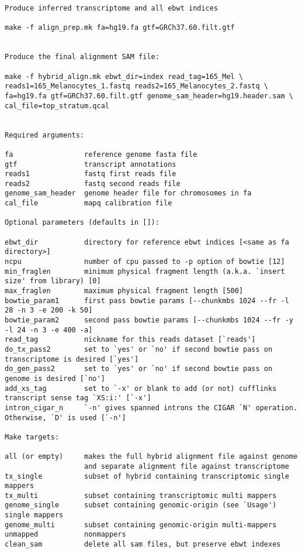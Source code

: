 \documentclass[10pt]{article}
\begin{document}
{\small
\begin{verbatim}
Produce inferred transcriptome and all ebwt indices

make -f align_prep.mk fa=hg19.fa gtf=GRCh37.60.filt.gtf


Produce the final alignment SAM file:

make -f hybrid_align.mk ebwt_dir=index read_tag=165_Mel \
reads1=165_Melanocytes_1.fastq reads2=165_Melanocytes_2.fastq \
fa=hg19.fa gtf=GRCh37.60.filt.gtf genome_sam_header=hg19.header.sam \
cal_file=top_stratum.qcal


Required arguments:

fa                 reference genome fasta file
gtf                transcript annotations
reads1             fastq first reads file
reads2             fastq second reads file
genome_sam_header  genome header file for chromosomes in fa
cal_file           mapq calibration file

Optional parameters (defaults in []):

ebwt_dir           directory for reference ebwt indices [<same as fa directory>]
ncpu               number of cpu passed to -p option of bowtie [12]
min_fraglen        minimum physical fragment length (a.k.a. `insert size' from library) [0]
max_fraglen        maximum physical fragment length [500]
bowtie_param1      first pass bowtie params [--chunkmbs 1024 --fr -l 28 -n 3 -e 200 -k 50]
bowtie_param2      second pass bowtie params [--chunkmbs 1024 --fr -y -l 24 -n 3 -e 400 -a]
read_tag           nickname for this reads dataset [`reads']
do_tx_pass2        set to `yes' or `no' if second bowtie pass on transcriptome is desired [`yes']
do_gen_pass2       set to `yes' or `no' if second bowtie pass on genome is desired [`no']
add_xs_tag         set to `-x' or blank to add (or not) cufflinks transcript sense tag `XS:i:' [`-x']
intron_cigar_n     `-n' gives spanned introns the CIGAR `N' operation. Otherwise, `D' is used [`-n']

Make targets:

all (or empty)     makes the full hybrid alignment file against genome
                   and separate alignment file against transcriptome
tx_single          subset of hybrid containing transcriptomic single mappers
tx_multi           subset containing transcriptomic multi mappers
genome_single      subset containing genomic-origin (see `Usage') single mappers
genome_multi       subset containing genomic-origin multi-mappers
unmapped           nonmappers
clean_sam          delete all sam files, but preserve ebwt indexes
\end{verbatim}
}
\end{document}
